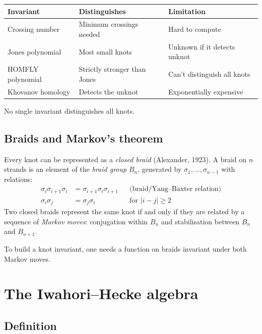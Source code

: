 \documentclass[12pt]{article}
\begin{document}
\begin{center}
\begin{tabular}{lll}
\hline
\textbf{Invariant} & \textbf{Distinguishes} & \textbf{Limitation} \\
\hline
Crossing number & Minimum crossings needed & Hard to compute \\
Jones polynomial & Most small knots & Unknown if it detects unknot \\
HOMFLY polynomial & Strictly stronger than Jones & Can't distinguish all knots \\
Khovanov homology & Detects the unknot & Exponentially expensive \\
\hline
\end{tabular}
\end{center}

No single invariant distinguishes all knots.

\subsection{Braids and Markov's theorem}

Every knot can be represented as a \emph{closed braid}
(Alexander, 1923). A braid on $n$ strands is an element of the
\emph{braid group} $B_n$, generated by $\sigma_1, \ldots, \sigma_{n-1}$
with relations:
\begin{align}
  \sigma_i \sigma_{i+1} \sigma_i &= \sigma_{i+1} \sigma_i \sigma_{i+1}
    && \text{(braid/Yang--Baxter relation)} \label{eq:braid} \\
  \sigma_i \sigma_j &= \sigma_j \sigma_i
    && \text{for } |i-j| \ge 2 \label{eq:comm}
\end{align}
Two closed braids represent the same knot if and only if they are related
by a sequence of \emph{Markov moves}: conjugation within $B_n$ and
stabilisation between $B_n$ and $B_{n+1}$.

To build a knot invariant, one needs a function on braids invariant under
both Markov moves.

\section{The Iwahori--Hecke algebra}

\subsection{Definition}
\end{document}
